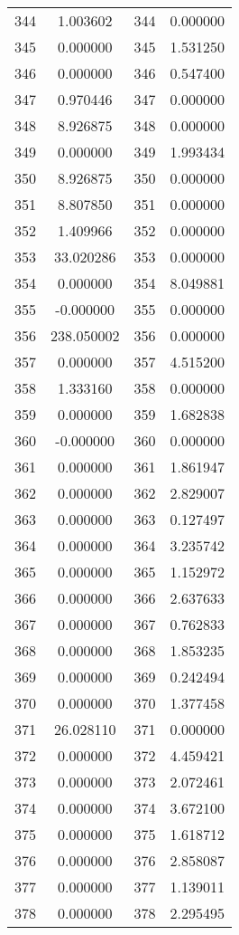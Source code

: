 \documentclass[12pt]{article}
\begin{document}
\begin{longtable}{@{}cccc@{}}
344 & 1.003602 & 344 & 0.000000 \\
345 & 0.000000 & 345 & 1.531250 \\
346 & 0.000000 & 346 & 0.547400 \\
347 & 0.970446 & 347 & 0.000000 \\
348 & 8.926875 & 348 & 0.000000 \\
349 & 0.000000 & 349 & 1.993434 \\
350 & 8.926875 & 350 & 0.000000 \\
351 & 8.807850 & 351 & 0.000000 \\
352 & 1.409966 & 352 & 0.000000 \\
353 & 33.020286 & 353 & 0.000000 \\
354 & 0.000000 & 354 & 8.049881 \\
355 & -0.000000 & 355 & 0.000000 \\
356 & 238.050002 & 356 & 0.000000 \\
357 & 0.000000 & 357 & 4.515200 \\
358 & 1.333160 & 358 & 0.000000 \\
359 & 0.000000 & 359 & 1.682838 \\
360 & -0.000000 & 360 & 0.000000 \\
361 & 0.000000 & 361 & 1.861947 \\
362 & 0.000000 & 362 & 2.829007 \\
363 & 0.000000 & 363 & 0.127497 \\
364 & 0.000000 & 364 & 3.235742 \\
365 & 0.000000 & 365 & 1.152972 \\
366 & 0.000000 & 366 & 2.637633 \\
367 & 0.000000 & 367 & 0.762833 \\
368 & 0.000000 & 368 & 1.853235 \\
369 & 0.000000 & 369 & 0.242494 \\
370 & 0.000000 & 370 & 1.377458 \\
371 & 26.028110 & 371 & 0.000000 \\
372 & 0.000000 & 372 & 4.459421 \\
373 & 0.000000 & 373 & 2.072461 \\
374 & 0.000000 & 374 & 3.672100 \\
375 & 0.000000 & 375 & 1.618712 \\
376 & 0.000000 & 376 & 2.858087 \\
377 & 0.000000 & 377 & 1.139011 \\
378 & 0.000000 & 378 & 2.295495 \\

\end{longtable}
\end{document}
